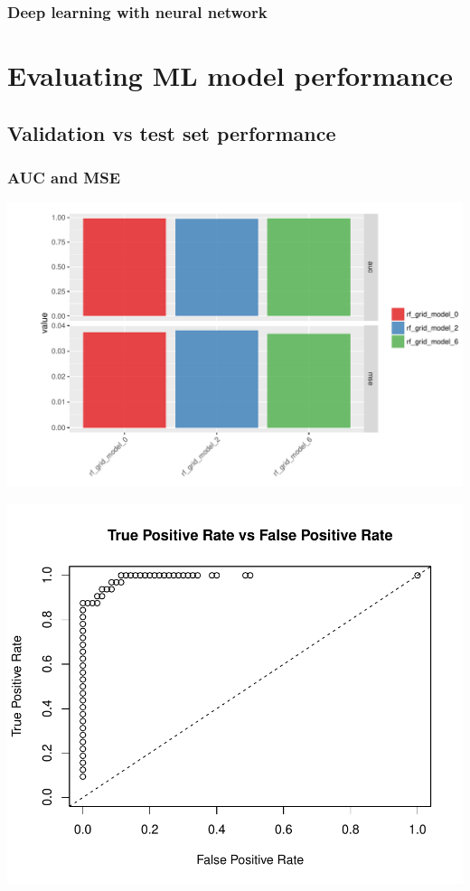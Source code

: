 \documentclass[notes, c, 11pt, xcolor=svgnames, hyperref={colorlinks,citecolor=DeepPink4,linkcolor=DarkRed,urlcolor=DarkBlue}]{beamer}
\begin{document}
\subsubsection{Deep learning with neural network}




\section{Evaluating ML model performance}

\subsection{Validation vs test set performance}

\begin{frame}
	\frametitle{AUC and MSE}
	
	\begin{center}\includegraphics[width=1\textwidth]{webinar_code_files/figure-latex/unnamed-chunk-29-1.pdf} \end{center}
	
	\begin{center}\includegraphics[width=1\textwidth]{webinar_code_files/figure-latex/unnamed-chunk-42-1} \end{center}
\end{frame}
\end{document}
